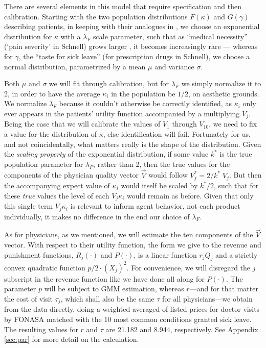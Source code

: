 \documentclass[../main.tex]{subfiles}
\begin{document}
There are several elements in this model that require specification and then calibration. Starting with the two population distributions $F(\kappa)$ and $G(\gamma)$ describing patients, in keeping with their analogues in \cite{schnell2017physician}, we choose an exponential distribution for $\kappa$ with a $\lambda_F$ scale parameter, such that as ``medical necessity'' (`pain severity' in Schnell) grows larger , it becomes increasingly rare — whereas for $\gamma$, the ``taste for sick leave'' (for prescription drugs in Schnell), we choose a normal distribution, parametrized by a mean $\mu$ and variance $\sigma$.

Both $\mu$ and $\sigma$ we will fit through calibration, but for $\lambda_F$ we simply normalize it to 2, in order to have the average $\kappa_i$ in the population be $1/2$, on aesthetic grounds. We normalize $\lambda_F$ because it couldn't otherwise be correctly identified, as $\kappa_i$ only ever appears in the patients' utility function accompanied by a multiplying $V_j$. Being the case that we will calibrate the values of $V_1$ through $V_{10}$, we need to fix a value for the distribution of $\kappa$, else identification will fail. Fortunately for us, and not coincidentally, what matters really is the shape of the distribution. Given the \textit{scaling property} of the exponential distribution, if some value $k^*$ is the true population parameter for $\lambda_F$, rather than 2, then the true values for the components of the physician quality vector $\vec{V}$ would follow $V_j^* = 2/k^* \; V_j$. But then the accompanying expect value of $\kappa_i$ would itself be scaled by $k^*/2$, such that for these \textit{true} values the level of each $V_j \kappa_i$ would remain as before. Given that only this single term $V_j \kappa_i$ is relevant to inform agent behavior, not each product individually, it makes no difference in the end our choice of $\lambda_F$.

As for physicians, as we mentioned, we will estimate the ten components of the $\vec{V}$ vector. With respect to their utility function, the form we give to the revenue and punishment functions, $R_j(\cdot)$ and $P(\cdot)$, is a linear function $r_j Q_j$ and a strictly convex quadratic function $p / 2 \cdot (X_j)^2$. For convenience, we will disregard the $j$ subscript in the revenue function like we have done all along for $P(\cdot)$. The parameter $p$ will be subject to GMM estimation, whereas $r$—and for that matter the cost of visit $\tau_j$, which shall also be the same $\tau$ for all physicians—we obtain from the data directly, doing a weighted averaged of listed prices for doctor visits by FONASA matched with the 10 most common conditions granted sick leave. The resulting values for $r$ and $\tau$ are 21.182 and 8.944, respectively. See Appendix \ref{sec:par} for more detail on the calculation.
\end{document}
